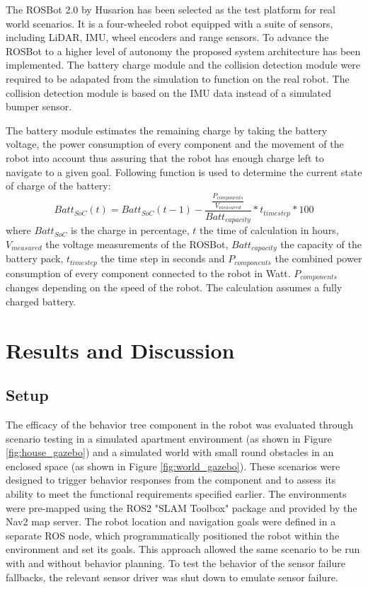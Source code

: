 \documentclass[letterpaper, 10pt, conference]{ieeeconf}
\begin{document}
The ROSBot 2.0 by Husarion has been selected as the test platform for real world scenarios. It is a four-wheeled robot equipped with a suite of sensors, including LiDAR, IMU, wheel encoders and range sensors. To advance the ROSBot to a higher level of autonomy the proposed system architecture has been implemented. The battery charge module and the collision detection module were required to be adapated from the simulation to function on the real robot. The collision detection module is based on the IMU data instead of a simulated bumper sensor.

The battery module estimates the remaining charge by taking the battery voltage, the power consumption of every component and the movement of the robot into account thus assuring that the robot has enough charge left to navigate to a given goal. Following function is used to determine the current state of charge of the battery: \[Batt_{SoC}(t) = Batt_{SoC}(t-1)-\frac{\frac{P_{components}}{V_{measured}}}{Batt_{capacity}}* t_{timestep} *100\] where $Batt_{SoC}$ is the charge in percentage, $t$ the time of calculation in hours, $V_{measured}$ the voltage measurements of the ROSBot, $Batt_{capacity}$ the capacity of the battery pack, $t_{timestep}$ the time step in seconds and $P_{components}$ the combined power consumption of every component connected to the robot in Watt. $P_{components}$ changes depending on the speed of the robot. The calculation assumes a fully charged battery.

\section{Results and Discussion}
\label{sec:ResultsAndDiscussion}

\subsection{Setup}

The efficacy of the behavior tree component in the robot was evaluated through scenario testing in a simulated apartment environment (as shown in Figure \ref{fig:house_gazebo}) and a simulated world with small round obstacles in an enclosed space (as shown in Figure \ref{fig:world_gazebo}). These scenarios were designed to trigger behavior responses from the component and to assess its ability to meet the functional requirements specified earlier. The environments were pre-mapped using the ROS2 "SLAM Toolbox" package and provided by the Nav2 map server. The robot location and navigation goals were defined in a separate ROS node, which programmatically positioned the robot within the environment and set its goals. This approach allowed the same scenario to be run with and without behavior planning. To test the behavior of the sensor failure fallbacks, the relevant sensor driver was shut down to emulate sensor failure.
\end{document}
